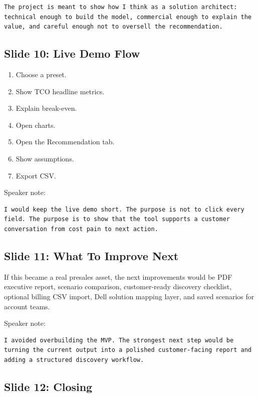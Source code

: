 \documentclass[11pt,a4paper]{article}
\begin{document}
\begin{lstlisting}
The project is meant to show how I think as a solution architect: technical enough to build the model, commercial enough to explain the value, and careful enough not to oversell the recommendation.
\end{lstlisting}

\subsection{Slide 10: Live Demo Flow}

\begin{enumerate}
  \item Choose a preset.
  \item Show TCO headline metrics.
  \item Explain break-even.
  \item Open charts.
  \item Open the Recommendation tab.
  \item Show assumptions.
  \item Export CSV.
\end{enumerate}

Speaker note:

\begin{lstlisting}
I would keep the live demo short. The purpose is not to click every field. The purpose is to show that the tool supports a customer conversation from cost pain to next action.
\end{lstlisting}

\subsection{Slide 11: What To Improve Next}

If this became a real presales asset, the next improvements would be PDF executive report, scenario comparison, customer-ready discovery checklist, optional billing CSV import, Dell solution mapping layer, and saved scenarios for account teams.

Speaker note:

\begin{lstlisting}
I avoided overbuilding the MVP. The strongest next step would be turning the current output into a polished customer-facing report and adding a structured discovery workflow.
\end{lstlisting}

\subsection{Slide 12: Closing}
\end{document}
